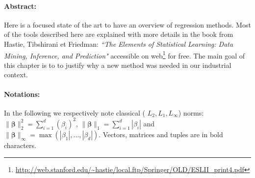 \documentclass[12pt,a4paper]{report}
\begin{document}
\paragraph{Abstract:} Here is a focused state of the art to have an overview of regression methods.%
Most of the tools described here are explained with more details in the book from  Hastie, Tibshirani et Friedman: {\it ``The Elements of Statistical Learning: Data Mining, Inference, and Prediction" } accessible on web\footnote{ \url{http://web.stanford.edu/~hastie/local.ftp/Springer/OLD/ESLII_print4.pdf}} for free. The main goal of this chapter is to %
to justify why a new method was needed in our industrial context. %
	
	
%			
		
%			
%



\paragraph{Notations:}	
In the following we respectively note classical ( $L_2,L_1,L_{\infty}$) norms: $\parallel\boldsymbol{\beta}\parallel_2^2=\sum_{i=1}^d(\beta_i)^2$, $\parallel\boldsymbol{\beta} \parallel_1=\sum_{i=1}^d|\beta_i| $ and $\parallel\boldsymbol{\beta} \parallel_{\infty}=\operatorname{max}(|\beta_1|,\dots,|\beta_d|)$. Vectors, matrices and tuples are in bold characters.
\end{document}
